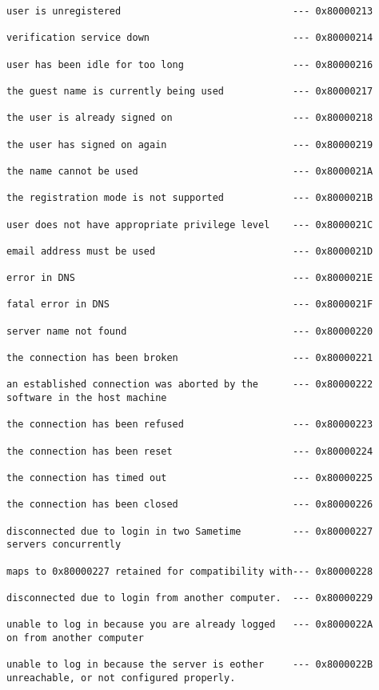 \documentclass[titlepage,oneside]{book}
\begin{document}
\begin{verbatim}
user is unregistered                              --- 0x80000213

verification service down                         --- 0x80000214

user has been idle for too long                   --- 0x80000216

the guest name is currently being used            --- 0x80000217

the user is already signed on                     --- 0x80000218

the user has signed on again                      --- 0x80000219

the name cannot be used                           --- 0x8000021A

the registration mode is not supported            --- 0x8000021B

user does not have appropriate privilege level    --- 0x8000021C

email address must be used                        --- 0x8000021D

error in DNS                                      --- 0x8000021E

fatal error in DNS                                --- 0x8000021F

server name not found                             --- 0x80000220

the connection has been broken                    --- 0x80000221

an established connection was aborted by the      --- 0x80000222
software in the host machine

the connection has been refused                   --- 0x80000223

the connection has been reset                     --- 0x80000224

the connection has timed out                      --- 0x80000225

the connection has been closed                    --- 0x80000226

disconnected due to login in two Sametime         --- 0x80000227
servers concurrently

maps to 0x80000227 retained for compatibility with--- 0x80000228

disconnected due to login from another computer.  --- 0x80000229

unable to log in because you are already logged   --- 0x8000022A
on from another computer

unable to log in because the server is eother     --- 0x8000022B
unreachable, or not configured properly.


\end{verbatim}
\end{document}
